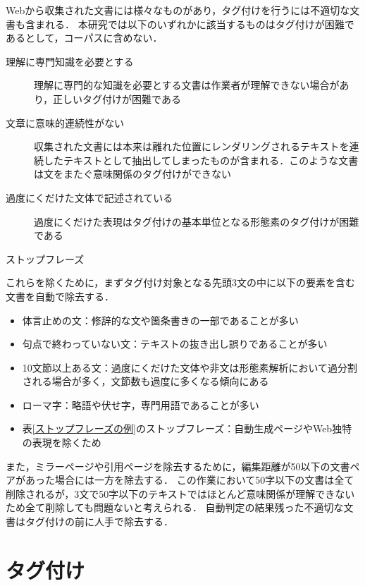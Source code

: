 \documentclass[japanese]{jnlp_1.4}
\begin{document}
Webから収集された文書には様々なものがあり，タグ付けを行うには不適切な文書も含まれる．
本研究では以下のいずれかに該当するものはタグ付けが困難であるとして，コーパスに含めない．
\begin{description}
 \item[理解に専門知識を必要とする] 理解に専門的な知識を必要とする文書は作業者が理解できない場合があり，正しいタグ付けが困難である
 \item[文章に意味的連続性がない] 収集された文書には本来は離れた位置にレンダリングされるテキストを連続したテキストとして抽出してしまったものが含まれる．このような文書は文をまたぐ意味関係のタグ付けができない
 \item[過度にくだけた文体で記述されている] 過度にくだけた表現はタグ付けの基本単位となる形態素のタグ付けが困難である
\end{description}

 \begin{table}[b]
\vspace{-0.5\Cvs}
  \caption{ストップフレーズ}
  \label{ストップフレーズの例}

\end{table}

これらを除くために，まずタグ付け対象となる先頭3文の中に以下の要素を含む文書を自動で除去する．
\begin{itemize}
 \item 体言止めの文：修辞的な文や箇条書きの一部であることが多い
 \item 句点で終わっていない文：テキストの抜き出し誤りであることが多い
 \item 10文節以上ある文：過度にくだけた文体や非文は形態素解析において過分割される場合が多く，文節数も過度に多くなる傾向にある
 \item ローマ字：略語や伏せ字，専門用語であることが多い
 \item 表\ref{ストップフレーズの例}のストップフレーズ：自動生成ページやWeb独特の表現を除くため
\end{itemize}
また，ミラーページや引用ページを除去するために，編集距離が50以下の文書ペアがあった場合には一方を除去する．
この作業において50字以下の文書は全て削除されるが，3文で50字以下のテキストではほとんど意味関係が理解できないため全て削除しても問題ないと考えられる．
自動判定の結果残った不適切な文書はタグ付けの前に人手で除去する．


\section{タグ付け}
\label{タグ付け内容と基準}
\end{document}
